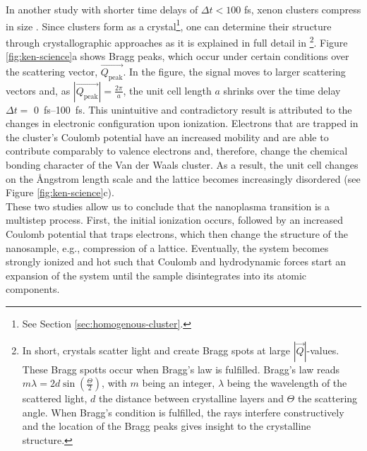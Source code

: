 In another study with shorter time delays of $\Delta t<100$ fs, xenon clusters compress in size \citep{Ferguson-2016-SciAdv}. Since clusters form as a crystal\footnote{See Section \ref{sec:homogenous-cluster}.}, one can determine their structure through crystallographic approaches as it is explained in full detail in \citep[][chapter 5]{Als-Nielson-2011-JWS}\footnote{In short, crystals scatter light and create Bragg spots at large $\left|\vec{Q}\right|$-values. These Bragg spotts occur when Bragg's law is fulfilled. Bragg's law reads $m \lambda = 2d \sin\left(\frac{\Theta}{2}\right)$, with $m$ being an integer, $\lambda$ being the wavelength of the scattered light, $d$ the distance between crystalline layers and $\Theta$ the scattering angle. When Bragg's condition is fulfilled, the rays interfere constructively and the location of the Bragg peaks gives insight to the crystalline structure.}. Figure \ref{fig:ken-science}a shows Bragg peaks, which occur under certain conditions over the scattering vector, $\vec{Q_{\text{peak}}}$. In the figure, the signal moves to larger scattering vectors and, as $\left|\vec{Q_{\text{peak}}}\right|=\frac{2\pi}{a}$, the unit cell length $a$ shrinks over the time delay $\Delta t =$ \SIrange{0}{100}{\femto\second}. This unintuitive and contradictory result is attributed to the changes in electronic configuration upon ionization. Electrons that are trapped in the cluster's Coulomb potential have an increased mobility and are able to contribute comparably to valence electrons and, therefore, change the chemical bonding character of the Van der Waals cluster. As a result, the unit cell changes on the {\AA}ngstrom length scale and the lattice becomes increasingly disordered (see Figure \ref{fig:ken-science}c).\\[1\baselineskip]
These two studies allow us to conclude that the nanoplasma transition is a multistep process. First, the initial ionization occurs, followed by an increased Coulomb potential that traps electrons, which then change the structure of the nanosample, e.g., compression of a lattice. Eventually, the system becomes strongly ionized and hot such that Coulomb and hydrodynamic forces start an expansion of the system until the sample disintegrates into its atomic components.
%
%
%
